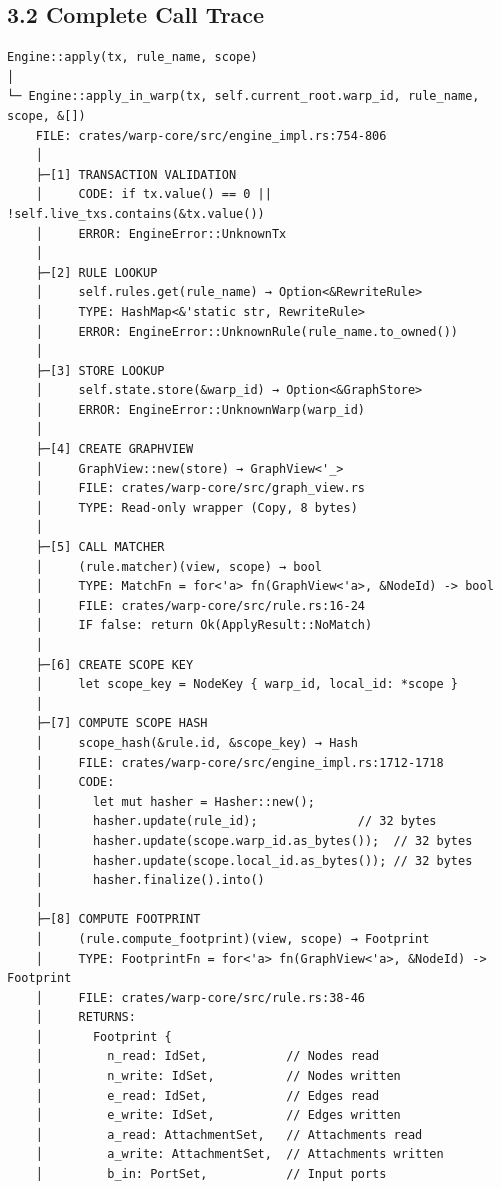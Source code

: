 \documentclass[
]{book}
\begin{document}
\subsection{3.2 Complete Call Trace}\label{complete-call-trace-1}

\begin{verbatim}
Engine::apply(tx, rule_name, scope)
│
└─ Engine::apply_in_warp(tx, self.current_root.warp_id, rule_name, scope, &[])
    FILE: crates/warp-core/src/engine_impl.rs:754-806
    │
    ├─[1] TRANSACTION VALIDATION
    │     CODE: if tx.value() == 0 || !self.live_txs.contains(&tx.value())
    │     ERROR: EngineError::UnknownTx
    │
    ├─[2] RULE LOOKUP
    │     self.rules.get(rule_name) → Option<&RewriteRule>
    │     TYPE: HashMap<&'static str, RewriteRule>
    │     ERROR: EngineError::UnknownRule(rule_name.to_owned())
    │
    ├─[3] STORE LOOKUP
    │     self.state.store(&warp_id) → Option<&GraphStore>
    │     ERROR: EngineError::UnknownWarp(warp_id)
    │
    ├─[4] CREATE GRAPHVIEW
    │     GraphView::new(store) → GraphView<'_>
    │     FILE: crates/warp-core/src/graph_view.rs
    │     TYPE: Read-only wrapper (Copy, 8 bytes)
    │
    ├─[5] CALL MATCHER
    │     (rule.matcher)(view, scope) → bool
    │     TYPE: MatchFn = for<'a> fn(GraphView<'a>, &NodeId) -> bool
    │     FILE: crates/warp-core/src/rule.rs:16-24
    │     IF false: return Ok(ApplyResult::NoMatch)
    │
    ├─[6] CREATE SCOPE KEY
    │     let scope_key = NodeKey { warp_id, local_id: *scope }
    │
    ├─[7] COMPUTE SCOPE HASH
    │     scope_hash(&rule.id, &scope_key) → Hash
    │     FILE: crates/warp-core/src/engine_impl.rs:1712-1718
    │     CODE:
    │       let mut hasher = Hasher::new();
    │       hasher.update(rule_id);              // 32 bytes
    │       hasher.update(scope.warp_id.as_bytes());  // 32 bytes
    │       hasher.update(scope.local_id.as_bytes()); // 32 bytes
    │       hasher.finalize().into()
    │
    ├─[8] COMPUTE FOOTPRINT
    │     (rule.compute_footprint)(view, scope) → Footprint
    │     TYPE: FootprintFn = for<'a> fn(GraphView<'a>, &NodeId) -> Footprint
    │     FILE: crates/warp-core/src/rule.rs:38-46
    │     RETURNS:
    │       Footprint {
    │         n_read: IdSet,           // Nodes read
    │         n_write: IdSet,          // Nodes written
    │         e_read: IdSet,           // Edges read
    │         e_write: IdSet,          // Edges written
    │         a_read: AttachmentSet,   // Attachments read
    │         a_write: AttachmentSet,  // Attachments written
    │         b_in: PortSet,           // Input ports

\end{verbatim}
\end{document}
